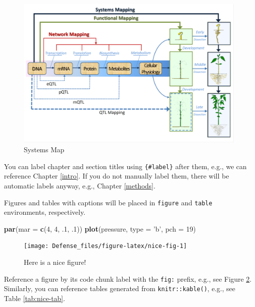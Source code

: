 \documentclass[11pt,]{book}
\newenvironment{Shaded}{\begin{snugshade}}{\end{snugshade}}
\newcommand{\KeywordTok}[1]{\textcolor[rgb]{0.13,0.29,0.53}{\textbf{{#1}}}}
\newcommand{\DataTypeTok}[1]{\textcolor[rgb]{0.13,0.29,0.53}{{#1}}}
\newcommand{\DecValTok}[1]{\textcolor[rgb]{0.00,0.00,0.81}{{#1}}}
\newcommand{\StringTok}[1]{\textcolor[rgb]{0.31,0.60,0.02}{{#1}}}
\newcommand{\NormalTok}[1]{{#1}}
\theoremstyle{definition}
\theoremstyle{definition}
\theoremstyle{remark}
\begin{document}
\begin{figure}

{\centering \includegraphics[width=0.8\linewidth]{images/SystemsMapping} 

}

\caption{Systems Map}\label{fig:system-map}
\end{figure}

You can label chapter and section titles using \texttt{\{\#label\}}
after them, e.g., we can reference Chapter \ref{intro}. If you do not
manually label them, there will be automatic labels anyway, e.g.,
Chapter \ref{methods}.

Figures and tables with captions will be placed in \texttt{figure} and
\texttt{table} environments, respectively.

\begin{Shaded}
\begin{Highlighting}[]
\KeywordTok{par}\NormalTok{(}\DataTypeTok{mar =} \KeywordTok{c}\NormalTok{(}\DecValTok{4}\NormalTok{, }\DecValTok{4}\NormalTok{, .}\DecValTok{1}\NormalTok{, .}\DecValTok{1}\NormalTok{))}
\KeywordTok{plot}\NormalTok{(pressure, }\DataTypeTok{type =} \StringTok{'b'}\NormalTok{, }\DataTypeTok{pch =} \DecValTok{19}\NormalTok{)}
\end{Highlighting}
\end{Shaded}

\begin{figure}

{\centering \texttt{[image: Defense\_files/figure-latex/nice-fig-1]} 

}

\caption{Here is a nice figure!}\label{fig:nice-fig}
\end{figure}

Reference a figure by its code chunk label with the \texttt{fig:}
prefix, e.g., see Figure \ref{fig:nice-fig}. Similarly, you can
reference tables generated from \texttt{knitr::kable()}, e.g., see Table
\ref{tab:nice-tab}.
\end{document}

